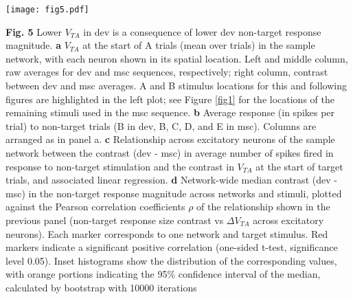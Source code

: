 \documentclass[pdflatex,referee,iicol,sn-basic]{sn-jnl}
\theoremstyle{thmstyleone}%
\theoremstyle{thmstyletwo}%
\theoremstyle{thmstylethree}%
\begin{document}
\begin{figure*}%
    \centering
    \texttt{[image: fig5.pdf]}
    \caption{}
    \label{fig5}
\end{figure*}
\textbf{Fig. 5} Lower $V_{TA}$ in dev is a consequence of lower dev non-target response magnitude.
\textbf{a} $V_{TA}$ at the start of A trials (mean over trials) in the sample network, with each neuron shown in its spatial location. Left and middle column, raw averages for dev and msc sequences, respectively; right column, contrast between dev and msc averages. A and B stimulus locations for this and following figures are highlighted in the left plot; see Figure \ref{fig1} for the locations of the remaining stimuli used in the msc sequence.
\textbf{b} Average response (in spikes per trial) to non-target trials (B in dev, B, C, D, and E in msc). Columns are arranged as in panel a.
\textbf{c} Relationship across excitatory neurons of the sample network between the contrast (dev - msc) in average number of spikes fired in response to non-target stimulation and the contrast in $V_{TA}$ at the start of target trials, and associated linear regression.
\textbf{d} Network-wide median contrast (dev - msc) in the non-target response magnitude across networks and stimuli, plotted against the Pearson correlation coefficients $\rho$ of the relationship shown in the previous panel (non-target response size contrast vs $\Delta V_{TA}$ across excitatory neurons). Each marker corresponds to one network and target stimulus. Red markers indicate a significant positive correlation (one-sided t-test, significance level 0.05). Inset histograms show the distribution of the corresponding values, with orange portions indicating the 95\% confidence interval of the median, calculated by bootstrap with 10000 iterations
\end{document}
